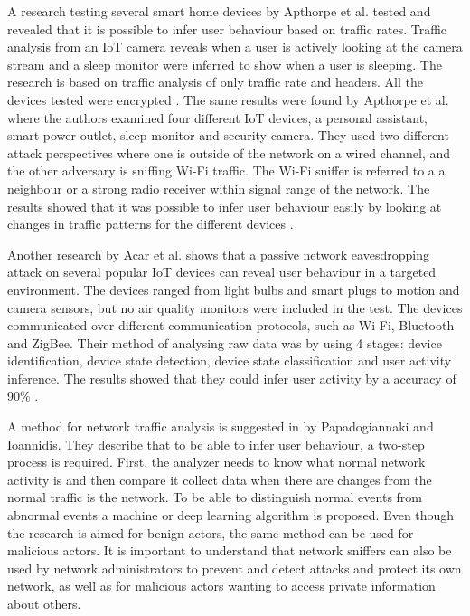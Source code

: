 A research testing several smart home devices by Apthorpe et al. \cite{SpyingonSmartHomes} tested and revealed that it is possible to infer user behaviour based on traffic rates. Traffic analysis from an \gls{IoT} camera reveals when a user is actively looking at the camera stream and a sleep monitor were inferred to show when a user is sleeping. The research is based on traffic analysis of only traffic rate and headers. All the devices tested were encrypted \cite{SpyingonSmartHomes}. The same results were found by Apthorpe et al.\cite{WiFiSniffInfer} where the authors examined four different \gls{IoT} devices, a personal assistant, smart power outlet, sleep monitor and security camera. They used two different attack perspectives where one is outside of the network on a wired channel, and the other adversary is sniffing \gls{Wi-Fi} traffic. The \gls{Wi-Fi} sniffer is referred to a a neighbour or a strong radio receiver within signal range of the network. The results showed that it was possible to infer user behaviour easily by looking at changes in traffic patterns for the different devices \cite{WiFiSniffInfer}. 

Another research by Acar et al. \cite{PeakaBoo} shows that a passive network eavesdropping attack on several popular \gls{IoT} devices can reveal user behaviour in a targeted environment. The devices ranged from light bulbs and smart plugs to motion and camera sensors, but no air quality monitors were included in the test. The devices communicated over different communication protocols, such as \gls{Wi-Fi}, Bluetooth and ZigBee. Their method of analysing raw data was by using 4 stages: device identification, device state detection, device state classification and user activity inference. The results showed that they could infer user activity by a accuracy of 90\% \cite{PeakaBoo}. 

A method for network traffic analysis is suggested in \cite{NetAna} by Papadogiannaki and Ioannidis. They describe that to be able to infer user behaviour, a two-step process is required. First, the analyzer needs to know what normal network activity is and then compare it collect data when there are changes from the normal traffic is the network. To be able to distinguish normal events from abnormal events a machine or deep learning algorithm is proposed. Even though the research is aimed for benign actors, the same method can be used for malicious actors. It is important to understand that network sniffers can also be used by network administrators to prevent and detect attacks and protect its own network, as well as for malicious actors wanting to access private information about others. 